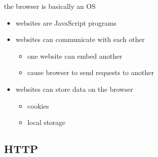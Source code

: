 \begin{frame}{the browser is basically an OS}
    \begin{itemize}
    \item websites are JavaScript programs
    \item websites can communicate with each other
        \begin{itemize}
        \item one website can embed another
        \item cause browser to send requests to another
        \end{itemize}
    \item websites can store data on the browser
        \begin{itemize}
        \item cookies
        \item local storage
        \end{itemize}
    \end{itemize}
\end{frame}

\subsection{HTTP}


